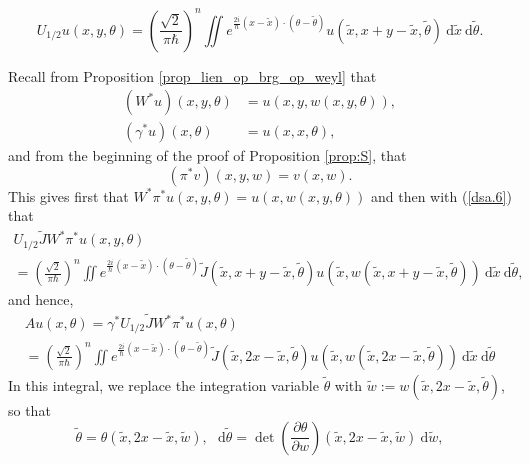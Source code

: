 \documentclass{article}
\newcommand{\DD}{\:\!\mathrm{d}}
\newcommand{\h}{\hbar}
\begin{document}
\begin{equation}\label{dsa.6}
  U_{1/2}u(x,y,\theta )=\left(\frac{\sqrt{2}}{\pi \h} \right)^n\iint
  e^{\frac{2i}{\h}(x-\widetilde{x})\cdot (\theta
    -\widetilde{\theta })}
  u(\widetilde{x},x+y-\widetilde{x},\widetilde{\theta
  })\DD\widetilde{x}\DD\widetilde{\theta }.
\end{equation}

\par Recall from Proposition \ref{prop_lien_op_brg_op_weyl} that
\begin{equation}\label{dsa.7}
  \begin{split}
    \left(W ^*u \right)(x,y,\theta )&=u(x,y,w(x,y,\theta )),\\
    \left( \gamma ^*u \right)(x,\theta )&=u(x,x,\theta ),
  \end{split}
\end{equation}
and from the beginning of the proof of Proposition \ref{prop:S}, that
\begin{equation}\label{dsa.8}
  \left(\pi ^*v \right)(x,y,w)=v(x,w).
\end{equation}
This gives first that $W ^*\pi ^*u(x,y,\theta )=u(x,w(x,y,\theta ))$
and then with (\ref{dsa.6}) that
\begin{multline}
  U_{1/2}\widetilde{J}W ^*\pi ^*u(x,y,\theta )\\
  =\left(\frac{\sqrt{2}}{\pi \h} \right)^n\iint
  e^{\frac{2i}{\h}(x-\widetilde{x})\cdot (\theta -\widetilde{\theta
    })}\widetilde{J}(\widetilde{x},x+y-\widetilde{x},\widetilde{\theta
  })u(\widetilde{x},w(\widetilde{x},x+y-\widetilde{x},\widetilde{\theta
  }))\DD\widetilde{x}\DD\widetilde{\theta },
\end{multline}
and hence,
\begin{multline}\label{dsa.9}
  Au(x,\theta )=\gamma ^*U_{1/2}\widetilde{J}W ^*\pi
  ^*u(x,\theta )\\
  =\left(\frac{\sqrt{2}}{\pi \h} \right)^n\iint
  e^{\frac{2i}{\h}(x-\widetilde{x})\cdot (\theta -\widetilde{\theta
    })}\widetilde{J}(\widetilde{x},2x-\widetilde{x},\widetilde{\theta
  })u(\widetilde{x},w(\widetilde{x},2x-\widetilde{x},\widetilde{\theta
  }))\DD\widetilde{x}\DD\widetilde{\theta}
\end{multline}
In this integral, we replace the integration variable
$\widetilde{\theta }$ with
$\widetilde{w}:=w(\widetilde{x},2x-\widetilde{x},\widetilde{\theta})$,
so that
\[
\widetilde{\theta }=\theta
(\widetilde{x},2x-\widetilde{x},\widetilde{w}),\ \
\DD\widetilde{\theta} = \det \left(\frac{\partial \theta }{\partial w}
\right)(\widetilde{x},2x-\widetilde{x},\widetilde{w})
\DD\widetilde{w},
\]
\end{document}
